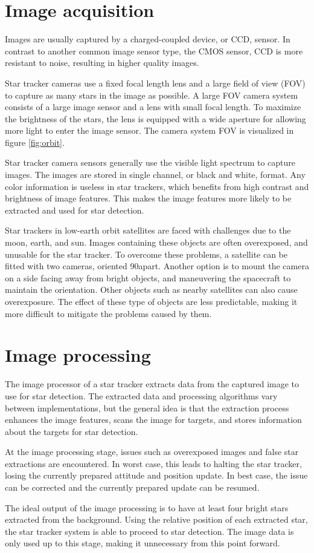 \documentclass[12pt]{report}
\begin{document}
\section{Image acquisition}
Images are usually captured by a charged-coupled device, or CCD, sensor. In contrast to another common image sensor type, the CMOS sensor, CCD is more resistant to noise, resulting in higher quality images.
\citep*{SatDesgin}
\par
Star tracker cameras use a fixed focal length lens and a large field of view (FOV) to capture as many stars in the image as possible. A large FOV camera system consists of a large image sensor and a lens with small focal length. To maximize the brightness of the stars, the lens is equipped with a wide aperture for allowing more light to enter the image sensor. The camera system FOV is visualized in figure \ref*{fig:orbit}. \citep*{SatDesgin}
\par
Star tracker camera sensors generally use the visible light spectrum to capture images. The images are stored in single channel, or black and white, format. Any color information is useless in star trackers, which  benefits from high contrast and brightness of image features. This makes the image features more likely to be extracted and used for star detection. \citep*{SatDesgin}
\par
Star trackers in low-earth orbit satellites are faced with challenges due to the moon, earth, and sun. Images containing these objects are often overexposed, and unusable for the star tracker. To overcome these problems, a satellite can be fitted with two cameras, oriented 90\textdegree apart. Another option is to mount the camera on a side facing away from bright objects, and maneuvering the spacecraft to maintain the orientation. Other objects such as nearby satellites can also cause overexposure. The effect of these type of objects are less predictable, making it more difficult to mitigate the problems caused by them. \citep*{SatDesgin}

\section{Image processing}
The image processor of a star tracker extracts data from the captured image to use for star detection. The extracted data and processing algorithms vary between implementations, but the general idea is that the extraction process enhances the image features, scans the image for targets, and stores information about the targets for star detection.
\par
At the image processing stage, issues such as overexposed images and false star extractions are encountered. In worst case, this leads to halting the star tracker, losing the currently prepared attitude and position update. In best case, the issue can be corrected and the currently prepared update can be resumed.   
\par
The ideal output of the image processing is to have at least four bright stars extracted from the background. Using the relative position of each extracted star, the star tracker system is able to proceed to star detection. The image data is only used up to this stage, making it unnecessary from this point forward.
\end{document}
